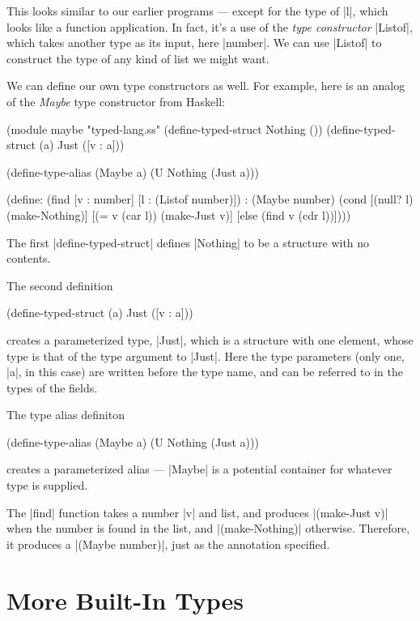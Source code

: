 \documentclass{book}
\begin{document}
\begin{schemeregion}
This looks similar to our earlier programs --- except for the type
of \scheme|l|, which looks like a function application.  In fact, it's
a use of the {\it type constructor} \scheme|Listof|, which takes
another type as its input, here \scheme|number|.  We can use
\scheme|Listof| to construct the type of any kind of list we might
want.  

We can define our own type constructors as well.  For example, here is
an analog of the {\it Maybe} type constructor from Haskell:

\begin{schemedisplay}
(module maybe "typed-lang.ss"
  (define-typed-struct Nothing ())
  (define-typed-struct (a) Just ([v : a]))
  
  (define-type-alias (Maybe a) (U Nothing (Just a)))
  
  (define: (find [v : number] [l : (Listof number)]) : (Maybe number)
    (cond [(null? l) (make-Nothing)]
          [(= v (car l)) (make-Just v)]
          [else (find v (cdr l))])))
\end{schemedisplay}

The first \scheme|define-typed-struct| defines \scheme|Nothing| to be
a structure with no contents.  

The second definition
\begin{schemedisplay}
(define-typed-struct (a) Just ([v : a]))
\end{schemedisplay}
creates a parameterized type, \scheme|Just|, which is a structure with
one element, whose type is that of the type argument to
\scheme|Just|.  Here the type parameters (only one, \scheme|a|, in
this case) are written before the type name, and can be referred to in
the types of the fields.

The type alias definiton
\begin{schemedisplay}
  (define-type-alias (Maybe a) (U Nothing (Just a)))
\end{schemedisplay}
creates a parameterized alias --- \scheme|Maybe| is a potential
container for whatever type is supplied.

The \scheme|find| function takes a number \scheme|v| and list, and
produces \scheme|(make-Just v)| when the number is found in the list,
and \scheme|(make-Nothing)| otherwise.  Therefore, it produces a
\scheme|(Maybe number)|, just as the annotation specified.  

\chapter{More Built-In Types}


\end{schemeregion}
\end{document}
